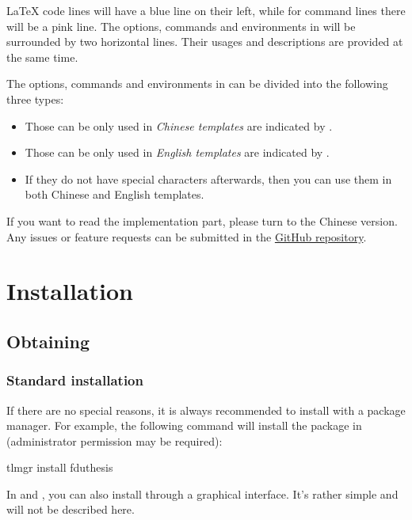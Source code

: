 \documentclass{fdudoc}
\begin{document}
\LaTeX{} code lines will have a blue line on their left, while
for command lines there will be a pink line. The options,
commands and environments in  will be surrounded
by two horizontal lines. Their usages and descriptions are
provided at the same time.

The options, commands and environments in  can be
divided into the following three types:
\begin{itemize}
  \item Those can be only used in \emph{Chinese templates} are
    indicated by \rexptarget\rexpstar{}.
  \item Those can be only used in \emph{English templates} are
    indicated by \rexptarget\expstar{}.
  \item If they do not have special characters afterwards, then
    you can use them in both Chinese and English templates.
\end{itemize}

If you want to read the implementation part, please turn to the
Chinese version. Any issues or feature requests can be submitted
in the \href{https://github.com/stone-zeng/fduthesis/issues}%
{GitHub repository}.

\section{Installation}

\subsection{Obtaining }

\subsubsection{Standard installation}

If there are no special reasons, it is always recommended to
install  with a package manager. For example,
the following command will install the package in \TeXLive{}
(administrator permission may be required):
\begin{shellexample}[gobble=1,morekeywords={tlmgr,install}]
  tlmgr install fduthesis
\end{shellexample}

In \TeXLive{} and \MiKTeX{}, you can also install 
through a graphical interface. It's rather simple and will not be
described here.
\end{document}
